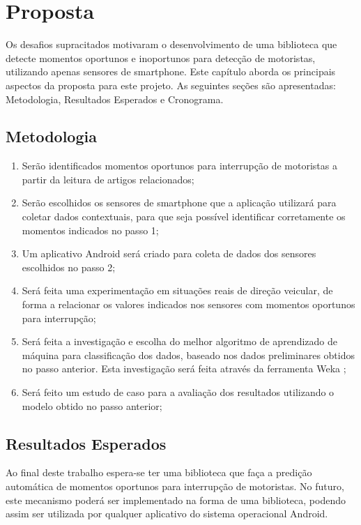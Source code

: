 \chapter{Proposta}
\label{proposta}
Os desafios supracitados motivaram o desenvolvimento de uma biblioteca que detecte momentos oportunos
e inoportunos para detecção de motoristas, utilizando apenas sensores de smartphone. 
Este capítulo aborda os principais aspectos da proposta para este projeto. As seguintes seções são apresentadas:
Metodologia, Resultados Esperados e Cronograma.

\section{Metodologia}
\label{metodologia}

\begin{enumerate}
  \item Serão identificados momentos oportunos para interrupção de motoristas a partir da leitura de artigos
relacionados;
  \item Serão escolhidos os sensores de smartphone que a aplicação utilizará para coletar dados contextuais, para
que seja possível identificar corretamente os momentos indicados no passo 1;
  \item Um aplicativo Android será criado para coleta de dados dos sensores escolhidos no passo 2;
  \item Será feita uma experimentação em situações reais de direção veicular, de forma a relacionar os valores indicados
nos sensores com momentos oportunos para interrupção;
  \item Será feita a investigação e escolha do melhor algoritmo de aprendizado de máquina para classificação dos dados,
baseado nos dados preliminares obtidos no passo anterior. Esta investigação será feita através da ferramenta Weka
\cite{hall2009weka};
  \item Será feito um estudo de caso para a avaliação dos resultados utilizando o modelo obtido no passo anterior;
\end{enumerate}

\section{Resultados Esperados}
\label{resultados}

Ao final deste trabalho espera-se ter uma biblioteca que faça a predição automática de momentos oportunos para
interrupção de motoristas. No futuro, este mecanismo poderá ser implementado na forma de uma biblioteca, podendo assim
ser utilizada por qualquer aplicativo do sistema operacional Android.

